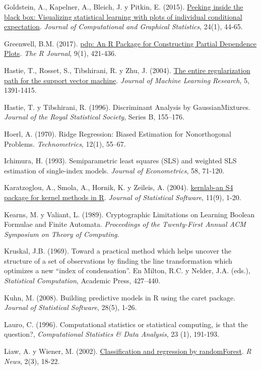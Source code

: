 \documentclass[
]{book}
\theoremstyle{break}
\theoremstyle{definition}
\theoremstyle{definition}
\theoremstyle{definition}
\theoremstyle{definition}
\theoremstyle{remark}
\begin{document}
Goldstein, A., Kapelner, A., Bleich, J. y Pitkin, E. (2015). \href{https://doi.org/10.1080/10618600.2014.907095}{Peeking inside the black box: Visualizing statistical learning with plots of individual conditional expectation}. \emph{Journal of Computational and Graphical Statistics}, 24(1), 44-65.

Greenwell, B.M. (2017). \href{https://journal.r-project.org/archive/2017/RJ-2017-016/index.html}{pdp: An R Package for Constructing Partial Dependence Plots}. \emph{The R Journal}, 9(1), 421-436.

Hastie, T., Rosset, S., Tibshirani, R. y Zhu, J. (2004). \href{https://www.jmlr.org/papers/v5/hastie04a.html}{The entire regularization path for the support vector machine}. \emph{Journal of Machine Learning Research}, 5, 1391-1415.

Hastie, T. y Tibshirani, R. (1996). Discriminant Analysis by GaussianMixtures. \emph{Journal of the Royal Statistical Society}, Series B, 155--176.

Hoerl, A. (1970). Ridge Regression: Biased Estimation for Nonorthogonal Problems. \emph{Technometrics}, 12(1), 55--67.

Ichimura, H. (1993). Semiparametric least squares (SLS) and weighted SLS estimation of single-index models. \emph{Journal of Econometrics}, 58, 71-120.

Karatzoglou, A., Smola, A., Hornik, K. y Zeileis, A. (2004). \href{http://www.jstatsoft.org/v11/i09}{kernlab-an S4 package for kernel methods in R}. \emph{Journal of Statistical Software}, 11(9), 1-20.

Kearns, M. y Valiant, L. (1989). Cryptographic Limitations on Learning Boolean Formulae and Finite Automata. \emph{Proceedings of the Twenty-First Annual ACM Symposium on Theory of Computing}.

Kruskal, J.B. (1969). Toward a practical method which helps uncover the structure of a set of observations by finding the line transformation which optimizes a new ``index of condensation''. En Milton, R.C. y Nelder, J.A. (eds.), \emph{Statistical Computation}, Academic Press, 427--440.

Kuhn, M. (2008). Building predictive models in R using the caret package. \emph{Journal of Statistical Software}, 28(5), 1-26.

Lauro, C. (1996). Computational statistics or statistical computing, is that the question?, \emph{Computational Statistics \& Data Analysis}, 23 (1), 191-193.

Liaw, A. y Wiener, M. (2002). \href{https://www.r-project.org/doc/Rnews/Rnews_2002-3.pdf}{Classification and regression by randomForest}. \emph{R News}, 2(3), 18-22.
\end{document}
